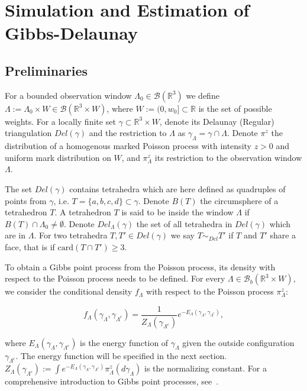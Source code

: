 \documentclass[12pt,a4paper]{report}
\begin{document}
\chapter{Simulation and Estimation of Gibbs-Delaunay}


\section{Preliminaries}
For a bounded observation window $\Lambda_0 \in\mathcal B(\mathbb R^3)$ we  define  $\Lambda := \Lambda_0 \times W \in \mathcal B(\mathbb R^3 \times W)$, where  $W:=(0,w_0]\subset \mathbb R$ is the set of possible weights. For a locally finite set $\gamma\subset \mathbb R^3\times W $, denote its Delaunay (Regular) triangulation $Del(\gamma)$ and the restriction to $\Lambda$ as  $\gamma_\Lambda = \gamma \cap \Lambda$. Denote $\pi^z$ the distribution of a homogenous marked Poisson process with intensity $z>0$ and uniform mark distribution on $W$, and $\pi^z_\Lambda$ its restriction to the observation window $\Lambda$. 

The set $Del(\gamma)$ contains tetrahedra which are here defined as quadruples of points from $\gamma$, i.e. $T=\{a,b,c,d\}\subset \gamma$. Denote $B(T)$ the circumsphere of a tetrahedron $T$. A tetrahedron $T$ is said to be inside the window $\Lambda$ if $B(T)\cap \Lambda_0 \neq \emptyset$. Denote $Del_\Lambda(\gamma)$ the set of all tetrahedra in $Del(\gamma)$ which are in $\Lambda$. For two tetrahedra $T,T'\in Del(\gamma)$ we say $T\sim_{Del} T'$ if $T$ and $T'$ share a face, that is if $\text{card}(T\cap T') \geq 3$. 

To obtain a Gibbs point process from the Poisson process, its density with respect to the Poisson process needs to be defined. For every $\Lambda \in \mathcal B_b(\mathbb R^3\times W)$, we consider the conditional density $f_\Lambda$ with respect to the Poisson process $\pi^z_\Lambda$:

$$ f_\Lambda(\gamma_\Lambda, \gamma_{\Lambda^c}) = \frac 1{Z_\Lambda(\gamma_{\Lambda^c})} e^{-E_\Lambda (\gamma_\Lambda, \gamma_{\Lambda^c})},$$ 

where $E_\Lambda(\gamma_\Lambda, \gamma_{\Lambda^c})$ is the energy function of $\gamma_\Lambda$ given the outside configuration $\gamma_{\Lambda^c}$. The energy function will be specified in the next section. $Z_\Lambda(\gamma_{\Lambda^c}) := \int e^{-E_\Lambda(\gamma_\Lambda, \gamma_{\Lambda^c})} \pi^z_\Lambda(d\gamma_\Lambda)$ is the normalizing constant.
For a comprehensive introduction to Gibbs point processes, see~\cite{dereudre2017}.
\end{document}
